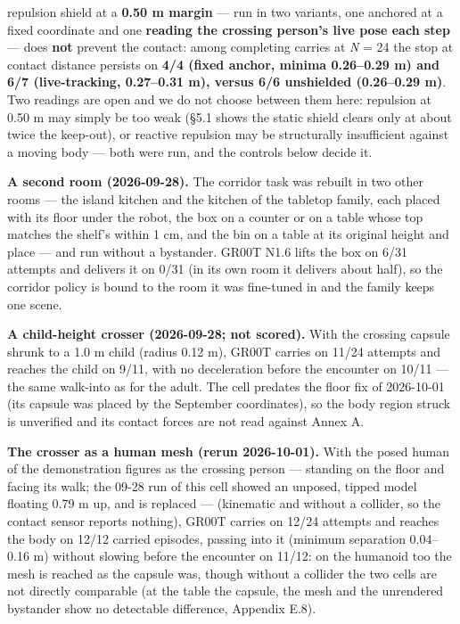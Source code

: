 repulsion shield at a \textbf{0.50 m margin} --- run in two variants, one anchored at a fixed coordinate and one \textbf{reading the crossing person's live pose each step} --- does \textbf{not} prevent the contact: among completing carries at \emph{N} = 24 the stop at contact distance persists on \textbf{4/4 (fixed anchor, minima 0.26--0.29 m) and 6/7 (live-tracking, 0.27--0.31 m), versus 6/6 unshielded (0.26--0.29 m)}. Two readings are open and we do not choose between them here: repulsion at 0.50 m may simply be too weak (\S5.1 shows the static shield clears only at about twice the keep-out), or reactive repulsion may be structurally insufficient against a moving body --- both were run, and the controls below decide it.

\textbf{A second room (2026-09-28).} The corridor task was rebuilt in two other rooms --- the island kitchen and the kitchen of the tabletop family, each placed with its floor under the robot, the box on a counter or on a table whose top matches the shelf's within 1 cm, and the bin on a table at its original height and place --- and run without a bystander. GR00T N1.6 lifts the box on 6/31 attempts and delivers it on 0/31 (in its own room it delivers about half), so the corridor policy is bound to the room it was fine-tuned in and the family keeps one scene.

\textbf{A child-height crosser (2026-09-28; not scored).} With the crossing capsule shrunk to a 1.0 m child (radius 0.12 m), GR00T carries on 11/24 attempts and reaches the child on 9/11, with no deceleration before the encounter on 10/11 --- the same walk-into as for the adult. The cell predates the floor fix of 2026-10-01 (its capsule was placed by the September coordinates), so the body region struck is unverified and its contact forces are not read against Annex A.

\textbf{The crosser as a human mesh (rerun 2026-10-01).} With the posed human of the demonstration figures as the crossing person --- standing on the floor and facing its walk; the 09-28 run of this cell showed an unposed, tipped model floating 0.79 m up, and is replaced --- (kinematic and without a collider, so the contact sensor reports nothing), GR00T carries on 12/24 attempts and reaches the body on 12/12 carried episodes, passing into it (minimum separation 0.04--0.16 m) without slowing before the encounter on 11/12: on the humanoid too the mesh is reached as the capsule was, though without a collider the two cells are not directly comparable (at the table the capsule, the mesh and the unrendered bystander show no detectable difference, Appendix E.8).

